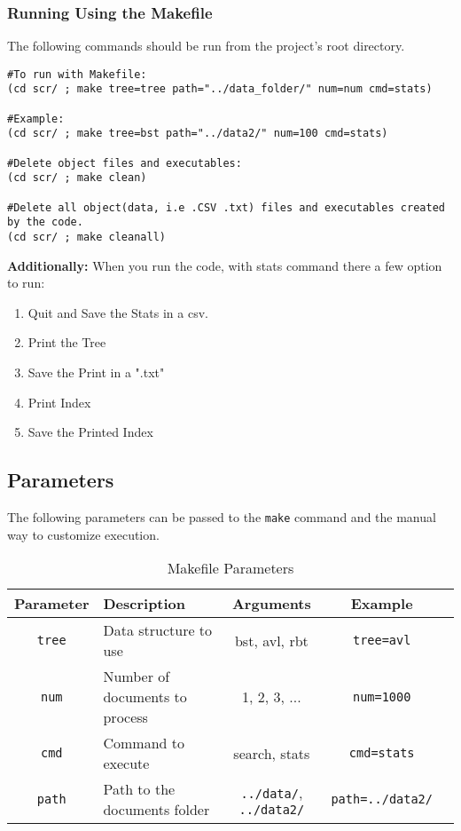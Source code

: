 \subsubsection{Running Using the Makefile}

The following commands should be run from the project's root directory.
    
    \begin{verbatim}
#To run with Makefile:
(cd scr/ ; make tree=tree path="../data_folder/" num=num cmd=stats)

#Example:
(cd scr/ ; make tree=bst path="../data2/" num=100 cmd=stats)

#Delete object files and executables: 
(cd scr/ ; make clean)

#Delete all object(data, i.e .CSV .txt) files and executables created by the code.
(cd scr/ ; make cleanall)
    \end{verbatim}

\textbf{Additionally:} When you run the code, with stats command there a few option to run:

\begin{enumerate}
    \item Quit and Save the Stats in a csv.
    \item Print the Tree
    \item Save the Print in a ".txt"
    \item Print Index 
    \item Save the Printed Index
\end{enumerate}


\subsection{Parameters}
The following parameters can be passed to the \texttt{make} command and the manual way to customize execution.

\begin{table}[H]
\centering
\renewcommand{\arraystretch}{1.3}
\begin{tabular}{|c|>{\centering\arraybackslash}p{6cm}|c|c|c|} 
\hline
\textbf{Parameter} & \textbf{Description} & \textbf{Arguments} & \textbf{Example} \\
\hline
\texttt{tree} & Data structure to use & bst, avl, rbt & \texttt{tree=avl} \\
\texttt{num} & Number of documents to process & 1, 2, 3, ... & \texttt{num=1000} \\
\texttt{cmd} & Command to execute & search, stats & \texttt{cmd=stats} \\
\texttt{path} & Path to the documents folder & \texttt{../data/}, \texttt{../data2/} & \texttt{path=../data2/} \\
\hline
\end{tabular}
\caption{Makefile Parameters}
\label{tab:config_params}
\end{table}

